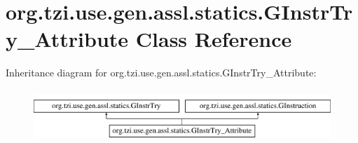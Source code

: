 \hypertarget{classorg_1_1tzi_1_1use_1_1gen_1_1assl_1_1statics_1_1_g_instr_try___attribute}{\section{org.\-tzi.\-use.\-gen.\-assl.\-statics.\-G\-Instr\-Try\-\_\-\-Attribute Class Reference}
\label{classorg_1_1tzi_1_1use_1_1gen_1_1assl_1_1statics_1_1_g_instr_try___attribute}
}
Inheritance diagram for org.\-tzi.\-use.\-gen.\-assl.\-statics.\-G\-Instr\-Try\-\_\-\-Attribute\-:\begin{figure}[H]
\begin{center}
\leavevmode
\includegraphics[height=2.000000cm]{classorg_1_1tzi_1_1use_1_1gen_1_1assl_1_1statics_1_1_g_instr_try___attribute}
\end{center}
\end{figure}

